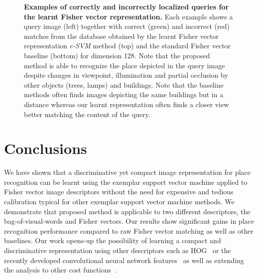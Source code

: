 \documentclass[10pt,twocolumn,letterpaper]{article}
\begin{document}
         \begin{table}[t]
            \begin{centering}
               
               \caption{ \textbf{Results on Pittsburgh 55k dataset.}
                  The fraction of correctly recognized queries (recall@K)
                  \textcolor{petr}{
                  in top $K\in\{1,2,5,10,20\}$ retrieved images.
                  The proposed method (\emph{e-SVM}) has been applied to Fisher vectors compressed to different dimensions.
                  } 
                  The learnt descriptors by the proposed method (FV e-SVM) consistently improve over the raw Fisher vector descriptors across the whole range of $K$  and all dimensions.
               }
            \label{tab:recall2}
            \end{centering}
         \end{table}
         \begin{figure}[h]
            
            \caption{
                \textbf{Examples of correctly and incorrectly localized queries for the learnt Fisher vector representation.}
                Each example shows a query image (left) together with correct (green) and incorrect (red) matches from the database obtained by the learnt Fisher vector representation \emph{e-SVM} method (top) and the standard Fisher vector baseline (bottom) for dimension 128. Note that the proposed method is able to recognize the place depicted in the query image despite changes in viewpoint, illumination and partial occlusion by other objects (trees, lamps) and buildings. 
                Note that the baseline methods often finds images depicting the same buildings but in a distance whereas our learnt representation often finds a closer view better matching the content of the query.       
            }
            \label{fig:images}
         \end{figure}

   \section{Conclusions}
      We have shown that a discriminative yet compact image representation for place recognition can be learnt using the exemplar support vector machine applied to Fisher vector image descriptors without the need for expensive and tedious calibration typical for other exemplar  support vector machine methods. 
      \textcolor{petr}{We demonstrate that proposed method is applicable to two different descriptors, the bag-of-visual-words and Fisher vectors.}
      Our results show significant gains in place recognition performance compared to raw Fisher vector matching as well as other baselines. Our work opens-up the possibility of learning a compact and discriminative representation using other descriptors such as HOG~\cite{Dalal05} or the recently developed convolutional neural network features~\cite{Donahue13,Krizhevsky12,Oquab14,Sermanet13} as well as extending the analysis to other cost functions~\cite{Gharbi12,Hariharan12}. 

\small{
   
   
}
\end{document}

